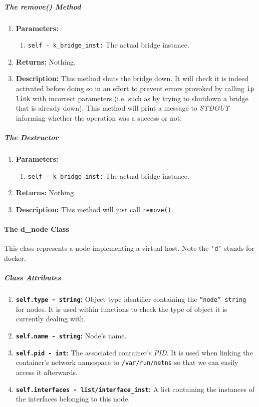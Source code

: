         \subparagraph{The remove() Method}
            \begin{enumerate}
                \item \textbf{Parameters:}
                \begin{enumerate}
                    \item \texttt{self - k\_bridge\_inst:} The actual bridge instance.
                \end{enumerate}
                \item \textbf{Returns:} Nothing.
                \item \textbf{Description:} This method shuts the bridge down. It will check it is indeed activated before doing so in an effort to prevent errors provoked by calling \texttt{ip link} with incorrect parameters (i.e. such as by trying to shutdown a bridge that is already down). This method will print a message to \textit{STDOUT} informing whether the operation was a success or not.
            \end{enumerate}

        \subparagraph{The Destructor}
            \begin{enumerate}
                \item \textbf{Parameters:}
                \begin{enumerate}
                    \item \texttt{self - k\_bridge\_inst:} The actual bridge instance.
                \end{enumerate}
                \item \textbf{Returns:} Nothing.
                \item \textbf{Description:} This method will just call \texttt{remove()}.
            \end{enumerate}

    \paragraph{The d\_node Class}
        This class represents a node implementing a virtual host. Note the \texttt{`d'} stands for docker.

        \subparagraph{Class Attributes}
            \begin{enumerate}
                \item \textbf{\texttt{self.type - string}:} Object type identifier containing the \texttt{``node'' string} for nodes. It is used within functions to check the type of object it is currently dealing with.
                \item \textbf{\texttt{self.name - string}:} Node's name.
                \item \textbf{\texttt{self.pid - int}:} The associated container's \textit{PID}. It is used when linking the container's network namespace to \texttt{/var/run/netns} so that we can easily access it afterwards.
                \item \textbf{\texttt{self.interfaces - list/interface\_inst}:}  A list containing the instances of the interfaces belonging to this node.
            \end{enumerate}


